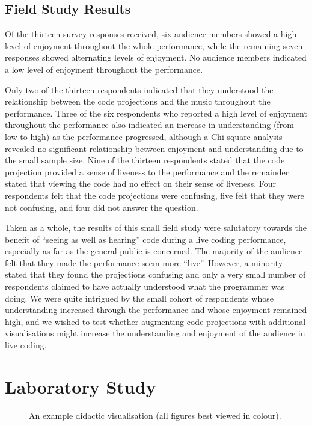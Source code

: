 \documentclass{sig-alternate}
\begin{document}
\subsection{Field Study Results}

Of the thirteen survey responses received, six audience members showed
a high level of enjoyment throughout the whole performance, while the
remaining seven responses showed alternating levels of enjoyment. No
audience members indicated a low level of enjoyment throughout the
performance.

Only two of the thirteen respondents indicated that they understood
the relationship between the code projections and the music throughout
the performance. Three of the six respondents who reported a high
level of enjoyment throughout the performance also indicated an
increase in understanding (from low to high) as the performance
progressed, although a Chi-square analysis revealed no significant
relationship between enjoyment and understanding due to the small
sample size. Nine of the thirteen respondents stated that the code
projection provided a sense of liveness to the performance and the
remainder stated that viewing the code had no effect on their sense of
liveness. Four respondents felt that the code projections were
confusing, five felt that they were not confusing, and four did not
answer the question.

Taken as a whole, the results of this small field study were
salutatory towards the benefit of ``seeing as well as hearing'' code
during a live coding performance, especially as far as the general
public is concerned. The majority of the audience felt that they made
the performance seem more ``live''. However, a minority stated that
they found the projections confusing and only a very small number of
respondents claimed to have actually understood what the programmer
was doing. We were quite intrigued by the small cohort of respondents
whose understanding increased through the performance and whose
enjoyment remained high, and we wished to test whether augmenting code
projections with additional visualisations might increase the
understanding and enjoyment of the audience in live coding.

\section{Laboratory Study}

\begin{figure}
\centering
{}
\caption{An example didactic visualisation (all
  figures best viewed in colour).}
\label{fig:didactic-visualisation}
\end{figure}
\end{document}
